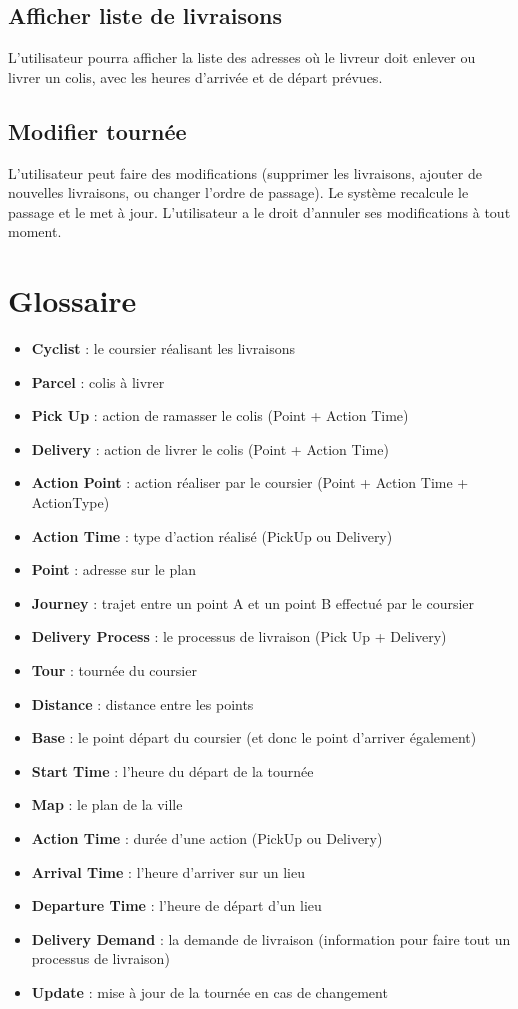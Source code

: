 \documentclass{scrartcl}
\begin{document}
\subsection{Afficher liste de livraisons}
L'utilisateur pourra afficher la liste des adresses où le livreur doit enlever ou livrer un colis, avec les heures d'arrivée et de départ prévues.

\subsection{Modifier tournée}
L'utilisateur peut faire des modifications (supprimer les livraisons, ajouter de nouvelles livraisons, ou changer l'ordre de passage). Le système recalcule le passage et le met à jour. L'utilisateur a le droit d'annuler ses modifications à tout moment.

\section{Glossaire}

\begin{itemize}
\item \textbf{Cyclist} : le coursier réalisant les livraisons
\item \textbf{Parcel} : colis à livrer
\item \textbf{Pick Up }: action de ramasser le colis (Point + Action Time)
\item \textbf{Delivery} : action de livrer le colis (Point + Action Time)
\item \textbf{Action Point} : action réaliser par le coursier (Point + Action Time + ActionType)
\item \textbf{Action Time} : type d'action réalisé (PickUp ou Delivery)
\item \textbf{Point} : adresse sur le plan
\item \textbf{Journey} : trajet entre un point A et un point B effectué par le coursier
\item \textbf{Delivery Process }: le processus de livraison (Pick Up + Delivery)
\item \textbf{Tour} : tournée du coursier
\item \textbf{Distance} : distance entre les points
\item \textbf{Base} : le point départ du coursier (et donc le point d'arriver également)
\item \textbf{Start Time} : l'heure du départ de la tournée
\item \textbf{Map} : le plan de la ville
\item \textbf{Action Time }: durée d'une action (PickUp ou Delivery)
\item \textbf{Arrival Time }: l'heure d'arriver sur un lieu
\item \textbf{Departure Time} : l'heure de départ d'un lieu
\item \textbf{Delivery Demand} : la demande de livraison (information pour faire tout un processus de livraison)
\item \textbf{Update }: mise à jour de la tournée en cas de changement

\end{itemize}
\end{document}
